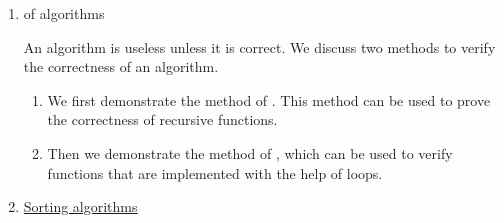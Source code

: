 \begin{enumerate}
\item {} of algorithms
      
      An algorithm is useless unless it is correct.  We discuss two methods to verify the correctness
      of an algorithm.
      \begin{enumerate}
      \item We first demonstrate the method of .
            This method can be used to prove the correctness of recursive functions.
      \item Then we demonstrate the method of , which can be used to verify functions
            that are implemented with the help of loops.
      \end{enumerate}
\item \href{http://en.wikipedia.org/wiki/Sorting_algorithm}{Sorting algorithms}


\end{enumerate}
